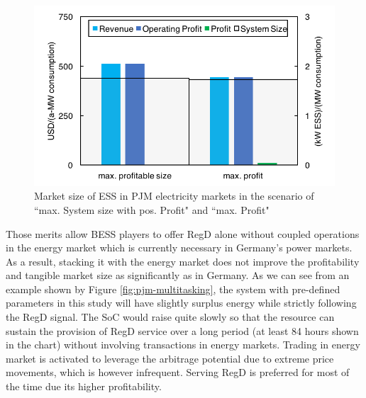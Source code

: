 \begin{figure}[h!]
	\centering
	\includegraphics[width=0.9\linewidth]{Figures/PJM_ESS_profitable_size}
	\caption{Market size of ESS in PJM electricity markets in the scenario of ``max. System size with pos. Profit" and ``max. Profit"}
	\label{fig:pjm-ess-profitable-size}
\end{figure}

Those merits allow BESS players to offer RegD alone without coupled operations in the energy market which is currently necessary in Germany's power markets. As a result, stacking it with the energy market does not improve the profitability and tangible market size as significantly as in Germany. As we can see from an example shown by Figure \ref{fig:pjm-multitasking}, the system with pre-defined parameters in this study will have slightly surplus energy while strictly following the RegD signal. The SoC would raise quite slowly so that the resource can sustain the provision of RegD service over a long period (at least 84 hours shown in the chart) without involving transactions in energy markets. Trading in energy market is activated to leverage the arbitrage potential due to extreme price movements, which is however infrequent. Serving RegD is preferred for most of the time due its higher profitability. 

